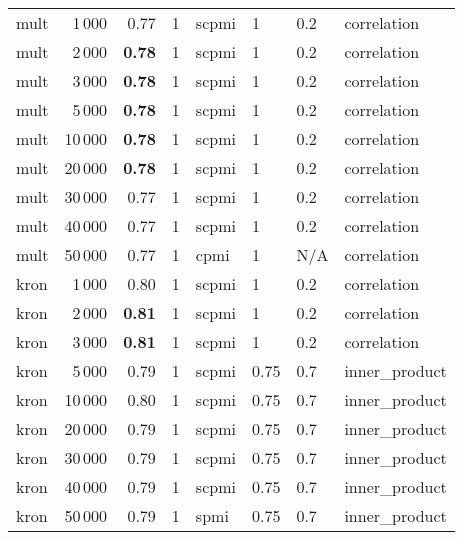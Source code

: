 \begin{tabular}{lrrlllll}
    mult &            1\,000 &  0.77 &     1 &  scpmi &       1 &  0.2 &    correlation \\
    mult &            2\,000 &  \textbf{0.78} &     1 &  scpmi &       1 &  0.2 &    correlation \\
    mult &            3\,000 &  \textbf{0.78} &     1 &  scpmi &       1 &  0.2 &    correlation \\
    mult &            5\,000 &  \textbf{0.78} &     1 &  scpmi &       1 &  0.2 &    correlation \\
    mult &           10\,000 & \textbf{ 0.78} &     1 &  scpmi &       1 &  0.2 &    correlation \\
    mult &           20\,000 &  \textbf{0.78} &     1 &  scpmi &       1 &  0.2 &    correlation \\
    mult &           30\,000 &  0.77 &     1 &  scpmi &       1 &  0.2 &    correlation \\
    mult &           40\,000 &  0.77 &     1 &  scpmi &       1 &  0.2 &    correlation \\
    mult &           50\,000 &  0.77 &     1 &   cpmi &       1 &  N/A &    correlation \\ \addlinespace
    kron &            1\,000 &  0.80 &     1 &  scpmi &       1 &  0.2 &    correlation \\
    kron &            2\,000 &  \textbf{0.81} &     1 &  scpmi &       1 &  0.2 &    correlation \\
    kron &            3\,000 &  \textbf{0.81} &     1 &  scpmi &       1 &  0.2 &    correlation \\
    kron &            5\,000 &  0.79 &     1 &  scpmi &    0.75 &  0.7 &  inner\_product \\
    kron &           10\,000 &  0.80 &     1 &  scpmi &    0.75 &  0.7 &  inner\_product \\
    kron &           20\,000 &  0.79 &     1 &  scpmi &    0.75 &  0.7 &  inner\_product \\
    kron &           30\,000 &  0.79 &     1 &  scpmi &    0.75 &  0.7 &  inner\_product \\
    kron &           40\,000 &  0.79 &     1 &  scpmi &    0.75 &  0.7 &  inner\_product \\
    kron &           50\,000 &  0.79 &     1 &   spmi &    0.75 &  0.7 &  inner\_product \\
\bottomrule
\end{tabular}

